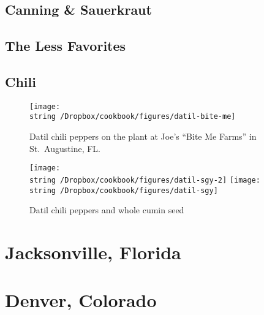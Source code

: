 \documentclass[12pt, final]{book}
\begin{document}
\chapter{Canning \& Sauerkraut}

\newpage

\newpage
\chapter{The Less Favorites}\label{lessfavorites}

\newpage

\newpage

\newpage

\newpage

\newpage

\newpage

\newpage

\newpage

\newpage

\newpage

\chapter{Chili}













\begin{figure}
\begin{center}
\texttt{[image: \\string~/Dropbox/cookbook/figures/datil-bite-me]}
\end{center}
\caption*{Datil chili peppers on the plant at Joe's ``Bite Me Farms'' in St.\ Augustine, FL.}
\end{figure}
\begin{figure}
\begin{center}
\texttt{[image: \\string~/Dropbox/cookbook/figures/datil-sgy-2]}
\texttt{[image: \\string~/Dropbox/cookbook/figures/datil-sgy]}
\end{center}
\caption*{Datil chili peppers and whole cumin seed}
\end{figure}
\part{Jacksonville, Florida}
\part{Denver, Colorado}

\end{document}
